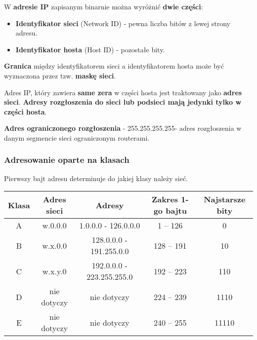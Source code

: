 \documentclass[main.tex]{subfiles}
\begin{document}
    \noindent W \textbf{adresie IP} zapisanym binarnie można wyróżnić \textbf{dwie części}:
    \begin{itemize}
        \item \textbf{Identyfikator sieci} (Network ID) - pewna liczba bitów z lewej strony adresu.
        \item \textbf{Identyfikator hosta} (Host ID) - pozostałe bity.
    \end{itemize}
    \textbf{Granica} między identyfikatorem sieci a identyfikatorem hosta może być wyznaczona przez
    tzw. \textbf{maskę sieci}.

    Adres IP, który zawiera \textbf{same zera} w części hosta jest traktowany jako \textbf{adres sieci}.
    \textbf{Adresy rozgłoszenia do sieci lub podsieci mają jedynki tylko w części hosta}.

    \textbf{Adres ograniczonego rozgłoszenia} - 255.255.255.255- adres rozgłoszenia
    w danym segmencie sieci ograniczonym routerami.\\

    \subsubsection{Adresowanie oparte na klasach}

    Pierwszy bajt adresu determinuje do jakiej klasy należy sieć.

    \begin{tabular}{|c|c|c|c|c|}
        \hline
        Klasa & Adres sieci & Adresy & Zakres 1-go bajtu & Najstarsze bity\\
        \hline
        A & w.0.0.0 & 1.0.0.0 - 126.0.0.0 & 1 – 126 & 0\\
        \hline
        B & w.x.0.0 & 128.0.0.0 - 191.255.0.0 & 128 – 191 & 10\\
        \hline
        C & w.x.y.0 & 192.0.0.0 - 223.255.255.0 & 192 – 223 & 110\\
        \hline
        D & nie dotyczy & nie dotyczy & 224 – 239 & 1110\\
        \hline
        E & nie dotyczy & nie dotyczy & 240 – 255 & 11110\\
        \hline
    \end{tabular}
\end{document}
